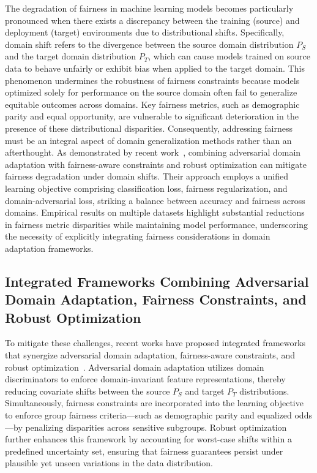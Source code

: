 \documentclass[sigconf]{acmart}
\begin{document}
The degradation of fairness in machine learning models becomes particularly pronounced when there exists a discrepancy between the training (source) and deployment (target) environments due to distributional shifts. Specifically, domain shift refers to the divergence between the source domain distribution \(P_S\) and the target domain distribution \(P_T\), which can cause models trained on source data to behave unfairly or exhibit bias when applied to the target domain. This phenomenon undermines the robustness of fairness constraints because models optimized solely for performance on the source domain often fail to generalize equitable outcomes across domains. Key fairness metrics, such as demographic parity and equal opportunity, are vulnerable to significant deterioration in the presence of these distributional disparities. Consequently, addressing fairness must be an integral aspect of domain generalization methods rather than an afterthought. As demonstrated by recent work~\cite{ref26}, combining adversarial domain adaptation with fairness-aware constraints and robust optimization can mitigate fairness degradation under domain shifts. Their approach employs a unified learning objective comprising classification loss, fairness regularization, and domain-adversarial loss, striking a balance between accuracy and fairness across domains. Empirical results on multiple datasets highlight substantial reductions in fairness metric disparities while maintaining model performance, underscoring the necessity of explicitly integrating fairness considerations in domain adaptation frameworks.

\subsection{Integrated Frameworks Combining Adversarial Domain Adaptation, Fairness Constraints, and Robust Optimization}

To mitigate these challenges, recent works have proposed integrated frameworks that synergize adversarial domain adaptation, fairness-aware constraints, and robust optimization~\cite{ref26}. Adversarial domain adaptation utilizes domain discriminators to enforce domain-invariant feature representations, thereby reducing covariate shifts between the source \(P_S\) and target \(P_T\) distributions. Simultaneously, fairness constraints are incorporated into the learning objective to enforce group fairness criteria—such as demographic parity and equalized odds—by penalizing disparities across sensitive subgroups. Robust optimization further enhances this framework by accounting for worst-case shifts within a predefined uncertainty set, ensuring that fairness guarantees persist under plausible yet unseen variations in the data distribution.
\end{document}
